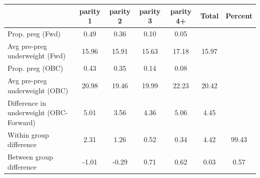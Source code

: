 \begin{tabular}{l*{6}{c}}
\toprule
            &\multicolumn{1}{c}{parity 1}&\multicolumn{1}{c}{parity 2}&\multicolumn{1}{c}{parity 3}&\multicolumn{1}{c}{parity 4+}&\multicolumn{1}{c}{Total}&\multicolumn{1}{c}{Percent}\\
\midrule
\midrule
Prop. preg (Fwd)&        0.49&        0.36&        0.10&        0.05&            &            \\
Avg pre-preg underweight (Fwd)&       15.96&       15.91&       15.63&       17.18&       15.97&            \\
Prop. preg (OBC)&        0.43&        0.35&        0.14&        0.08&            &            \\
Avg pre-preg underweight (OBC)&       20.98&       19.46&       19.99&       22.23&       20.42&            \\
Difference in underweight (OBC-Forward)&        5.01&        3.56&        4.36&        5.06&        4.45&            \\
Within group difference&        2.31&        1.26&        0.52&        0.34&        4.42&       99.43\\
Between group difference&       -1.01&       -0.29&        0.71&        0.62&        0.03&        0.57\\
\bottomrule
\end{tabular}
